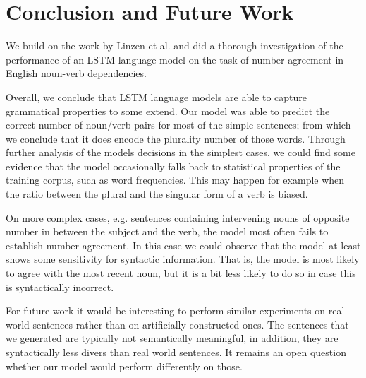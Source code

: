 \documentclass[11pt,a4paper]{article}
\begin{document}





\section{Conclusion and Future Work}
\label{conclusion}


We build on the work by Linzen et al. \citep{Linzen2016}
and did a thorough investigation of the performance of an LSTM language model
on the task of number agreement in English
noun-verb dependencies.

Overall, we conclude that LSTM language models
are able to capture grammatical properties to some extend.
Our model was able to predict the correct number of noun/verb pairs 
for most of the simple sentences;
from which we conclude that it does encode the plurality number of those words. 
Through further analysis of the models decisions in the simplest cases, we could find some evidence that the model occasionally falls back to statistical properties of the training corpus, such as word frequencies.
This may happen for example when the ratio between the plural 
and the singular form of a verb is biased.

On more complex cases, e.g. sentences containing intervening nouns 
of opposite number
in between the subject and the verb, 
the model most often fails to establish number agreement. 
In this case we could observe that the model at least shows 
some sensitivity for syntactic information.
That is, the model is most likely to agree with the
most recent noun, but it is a bit less likely to do so 
in case this is syntactically incorrect.

For future work it would be interesting to perform similar experiments on real world sentences rather than on artificially constructed ones. 
The sentences that we generated are typically not semantically meaningful,
in addition, they are syntactically less divers than real world sentences. 
It remains an open question whether our model would perform differently on those.
\end{document}
